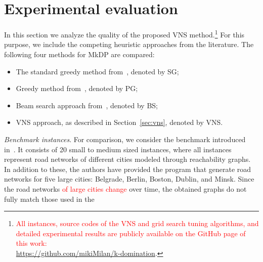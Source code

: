 \documentclass[dvipsnames,format=sigconf]{acmart} %
\begin{document}
\section{Experimental evaluation}\label{sec:experiments}

In this section we analyze the quality of the proposed VNS method.\footnote{\textcolor{red}{All instances, source codes of the VNS and grid search tuning algorithms, and detailed experimental results are publicly available on the GitHub page of this work: \\\url{https://github.com/mikiMilan/k-domination}}.} For this purpose, we include the competing heuristic approaches from the literature. The following four methods for MkDP are compared:  

\begin{itemize}
	\item The standard greedy method from~\cite{parekh1991analysis,gagarin2013randomized}, denoted by SG;
	\item Greedy method from~\cite{gagarin2018multiple}, denoted by PG;
	\item Beam search approach from~\cite{corcoran2021heuristics}, denoted by BS;
	\item VNS approach, as described in Section~\ref{sec:vns}, denoted by VNS.  
\end{itemize}


\emph{Benchmark instances}. For comparison, we consider the benchmark introduced in~\cite{corcoran2021heuristics}. It consists of 20 small to medium sized instances, where all instances represent road networks of different cities modeled through reachability graphs. In addition to these, the authors have provided the program that generate road networks for five large cities: Belgrade, Berlin, Boston, Dublin, and Minsk. Since the road networks \textcolor{red}{of large cities change} over time, the obtained graphs do not fully match those used in the \cite{corcoran2021heuristics}

\end{document}
